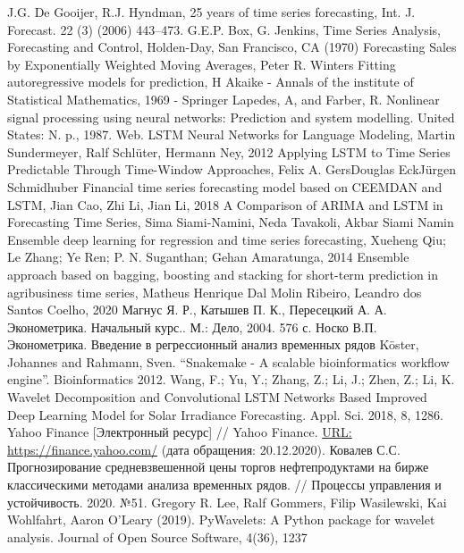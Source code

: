 \documentclass[a4paper,article,14pt]{extarticle}
\begin{document}
\begin{thebibliography}{1}
 J.G. De Gooijer, R.J. Hyndman, 25 years of time series forecasting, Int. J. Forecast. 22 (3) (2006) 443–473.
 G.E.P. Box, G. Jenkins, Time Series Analysis, Forecasting and Control, Holden-Day, San Francisco, CA (1970)
 Forecasting Sales by Exponentially Weighted Moving Averages, Peter R. Winters
 Fitting autoregressive models for prediction, H Akaike - Annals of the institute of Statistical Mathematics, 1969 - Springer
 Lapedes, A, and Farber, R. Nonlinear signal processing using neural networks: Prediction and system modelling. United States: N. p., 1987. Web.
 LSTM Neural Networks for Language Modeling, Martin Sundermeyer, Ralf Schlüter, Hermann Ney, 2012
 Applying LSTM to Time Series Predictable Through Time-Window Approaches, Felix A. GersDouglas EckJürgen Schmidhuber
 Financial time series forecasting model based on CEEMDAN and LSTM, Jian Cao, Zhi Li, Jian Li, 2018
 A Comparison of ARIMA and LSTM in Forecasting Time Series, Sima Siami-Namini, Neda Tavakoli, Akbar Siami Namin
 Ensemble deep learning for regression and time series forecasting, Xueheng Qiu; Le Zhang; Ye Ren; P. N. Suganthan; Gehan Amaratunga, 2014
 Ensemble approach based on bagging, boosting and stacking for short-term prediction in agribusiness time series, Matheus Henrique Dal Molin Ribeiro, Leandro dos Santos Coelho, 2020
 Магнус Я. Р., Катышев П. К., Пересецкий А. А. Эконометрика. Начальный курс.. М.: Дело, 2004. 576 с.
 Носко В.П. Эконометрика. Введение в регрессионный анализ временных рядов
 Köster, Johannes and Rahmann, Sven. “Snakemake - A scalable bioinformatics workflow engine”. Bioinformatics 2012.
 Wang, F.; Yu, Y.; Zhang, Z.; Li, J.; Zhen, Z.; Li, K. Wavelet Decomposition and Convolutional LSTM Networks Based Improved Deep Learning Model for Solar Irradiance Forecasting. Appl. Sci. 2018, 8, 1286.
 Yahoo Finance [Электронный ресурс] // Yahoo Finance. \url{URL:  https://finance.yahoo.com/} (дата обращения: 20.12.2020).
 Ковалев С.С. Прогнозирование средневзвешенной цены торгов нефтепродуктами на бирже классическими методами анализа временных рядов. // Процессы управления и устойчивость. 2020. №51.
 Gregory R. Lee, Ralf Gommers, Filip Wasilewski, Kai Wohlfahrt, Aaron O’Leary (2019). PyWavelets: A Python package for wavelet analysis. Journal of Open Source Software, 4(36), 1237
\end{thebibliography}
\end{document}
